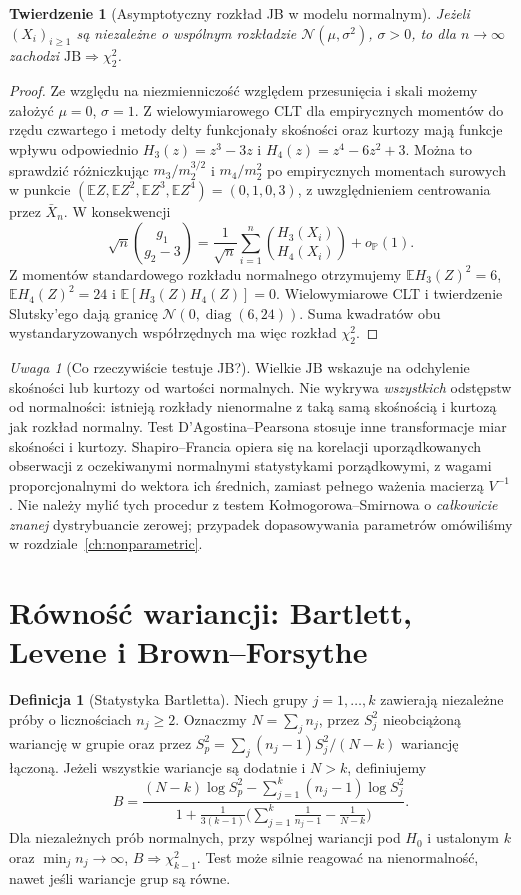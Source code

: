 \documentclass[11pt,a4paper,oneside]{report}
\numberwithin{equation}{chapter}
\theoremstyle{plain}
\newtheorem{twierdzenie}{Twierdzenie}[chapter]
\theoremstyle{definition}
\newtheorem{definicja}{Definicja}[chapter]
\theoremstyle{remark}
\newtheorem{uwaga}{Uwaga}[chapter]
\newcommand{\Prob}{\mathbb P}
\newcommand{\E}{\mathbb E}
\newcommand{\Normal}{\mathcal N}
\DeclareMathOperator{\diag}{diag}
\begin{document}
\begin{twierdzenie}[Asymptotyczny rozkład JB w modelu normalnym]\label{thm:jb}
Jeżeli $(X_i)_{i\ge1}$ są niezależne o wspólnym rozkładzie $\Normal(\mu,\sigma^2)$, $\sigma>0$, to dla $n\to\infty$ zachodzi $\mathrm{JB}\Rightarrow\chi^2_2$.
\end{twierdzenie}
\begin{proof}
Ze względu na niezmienniczość względem przesunięcia i skali możemy założyć $\mu=0$, $\sigma=1$. Z wielowymiarowego CLT dla empirycznych momentów do rzędu czwartego i metody delty funkcjonały skośności oraz kurtozy mają funkcje wpływu odpowiednio $H_3(z)=z^3-3z$ i $H_4(z)=z^4-6z^2+3$. Można to sprawdzić różniczkując $m_3/m_2^{3/2}$ i $m_4/m_2^2$ po empirycznych momentach surowych w punkcie $(\E Z,\E Z^2,\E Z^3,\E Z^4)=(0,1,0,3)$, z uwzględnieniem centrowania przez $\bar X_n$. W konsekwencji
\[
 \sqrt n\binom{g_1}{g_2-3}=\frac1{\sqrt n}\sum_{i=1}^n\binom{H_3(X_i)}{H_4(X_i)}+o_\Prob(1).
\]
Z momentów standardowego rozkładu normalnego otrzymujemy $\E H_3(Z)^2=6$, $\E H_4(Z)^2=24$ i $\E[H_3(Z)H_4(Z)]=0$. Wielowymiarowe CLT i twierdzenie Slutsky'ego dają granicę $\Normal(0,\diag(6,24))$. Suma kwadratów obu wystandaryzowanych współrzędnych ma więc rozkład $\chi^2_2$.
\end{proof}

\begin{uwaga}[Co rzeczywiście testuje JB?]
Wielkie $\mathrm{JB}$ wskazuje na odchylenie skośności lub kurtozy od wartości normalnych. Nie wykrywa \emph{wszystkich} odstępstw od normalności: istnieją rozkłady nienormalne z taką samą skośnością i kurtozą jak rozkład normalny. Test D'Agostina--Pearsona stosuje inne transformacje miar skośności i kurtozy. Shapiro--Francia opiera się na korelacji uporządkowanych obserwacji z oczekiwanymi normalnymi statystykami porządkowymi, z wagami proporcjonalnymi do wektora ich średnich, zamiast pełnego ważenia macierzą $V^{-1}$. Nie należy mylić tych procedur z testem Kołmogorowa--Smirnowa o \emph{całkowicie znanej} dystrybuancie zerowej; przypadek dopasowywania parametrów omówiliśmy w rozdziale~\ref{ch:nonparametric}.
\end{uwaga}

\section{Równość wariancji: Bartlett, Levene i Brown--Forsythe}
\begin{definicja}[Statystyka Bartletta]\label{def:bartlett}
Niech grupy $j=1,\ldots,k$ zawierają niezależne próby o licznościach $n_j\ge2$. Oznaczmy $N=\sum_j n_j$, przez $S_j^2$ nieobciążoną wariancję w grupie oraz przez $S_p^2=\sum_j(n_j-1)S_j^2/(N-k)$ wariancję łączoną. Jeżeli wszystkie wariancje są dodatnie i $N>k$, definiujemy
\[
 B=\frac{(N-k)\log S_p^2-\sum_{j=1}^k(n_j-1)\log S_j^2}{1+\frac1{3(k-1)}\bigl(\sum_{j=1}^k\frac1{n_j-1}-\frac1{N-k}\bigr)}.
\]
Dla niezależnych prób normalnych, przy wspólnej wariancji pod $H_0$ i ustalonym $k$ oraz $\min_j n_j\to\infty$, $B\Rightarrow\chi^2_{k-1}$. Test może silnie reagować na nienormalność, nawet jeśli wariancje grup są równe.
\end{definicja}
\end{document}
